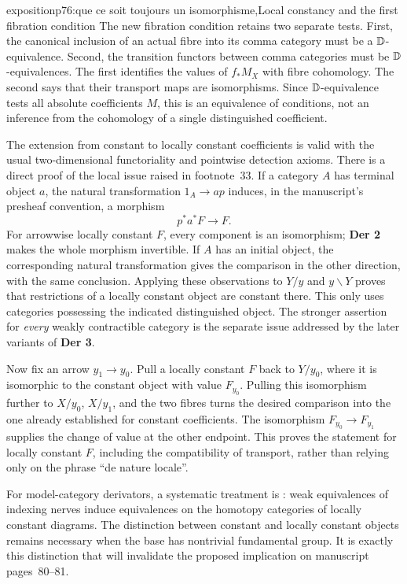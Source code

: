 \begin{dcomment}{exposition}{p76:que ce soit toujours un isomorphisme,}{Local constancy and the first fibration condition}
The new fibration condition retains two separate tests. First, the canonical inclusion of an actual fibre into its comma category must be a $\mathbb{D}$-equivalence. Second, the transition functors between comma categories must be $\mathbb{D}$-equivalences. The first identifies the values of $f_*M_X$ with fibre cohomology. The second says that their transport maps are isomorphisms. Since $\mathbb{D}$-equivalence tests all absolute coefficients $M$, this is an equivalence of conditions, not an inference from the cohomology of a single distinguished coefficient.

The extension from constant to locally constant coefficients is valid with the usual two-dimensional functoriality and pointwise detection axioms. There is a direct proof of the local issue raised in footnote~33. If a category $A$ has terminal object $a$, the natural transformation $1_A\to ap$ induces, in the manuscript's presheaf convention, a morphism
\[
 p^*a^*F\longrightarrow F.
\]
For arrowwise locally constant $F$, every component is an isomorphism; \textbf{Der 2} makes the whole morphism invertible. If $A$ has an initial object, the corresponding natural transformation gives the comparison in the other direction, with the same conclusion. Applying these observations to $Y/y$ and $y\backslash Y$ proves that restrictions of a locally constant object are constant there. This only uses categories possessing the indicated distinguished object. The stronger assertion for \emph{every} weakly contractible category is the separate issue addressed by the later variants of \textbf{Der 3}.

Now fix an arrow $y_1\to y_0$. Pull a locally constant $F$ back to $Y/y_0$, where it is isomorphic to the constant object with value $F_{y_0}$. Pulling this isomorphism further to $X/y_0$, $X/y_1$, and the two fibres turns the desired comparison into the one already established for constant coefficients. The isomorphism $F_{y_0}\to F_{y_1}$ supplies the change of value at the other endpoint. This proves the statement for locally constant $F$, including the compatibility of transport, rather than relying only on the phrase ``de nature locale''.

For model-category derivators, a systematic treatment is \citet[Theorem~1.3 and Section~3]{Cisinski2009LocallyConstant}: weak equivalences of indexing nerves induce equivalences on the homotopy categories of locally constant diagrams. The distinction between constant and locally constant objects remains necessary when the base has nontrivial fundamental group. It is exactly this distinction that will invalidate the proposed implication on manuscript pages~80--81.
\end{dcomment}


